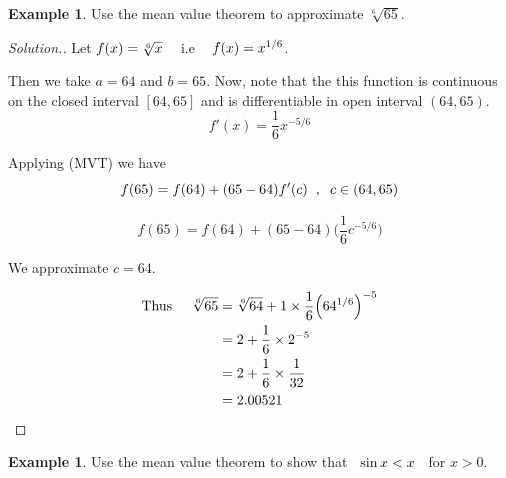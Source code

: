 \documentclass[11pt,a4paper]{article}
\theoremstyle{definition}
\newtheorem{exa}[thm]{Example}
\newenvironment{solution}
  {\renewcommand{\qedsymbol}{}\begin{proof}[\textit{Solution}.]}
  {\end{proof}}
\begin{document}
\begin{exa}


Use the mean value theorem to approximate $\sqrt[6]{65}$.
\end{exa}


\begin{solution}


Let $f(x) = \sqrt[6]{x}\hspace{0.3cm}$ i.e $\hspace{0.3cm} f(x) = x^{1/6}$.


Then we take $a = 64$ and $b = 65$. Now, note that the this function is continuous on the closed interval $[64,65]$ and is differentiable in open interval $(64,65)$. 
$$f'(x) = \frac{1}{6}x^{-5/6}$$

Applying (MVT) we have
$$f(65) = f(64) + (65 - 64)f'(c)\hspace{0.2cm}, \hspace{0.2cm} c \in (64,65)$$ 

$$f(65) = f(64) + (65 - 64)\Big(\frac{1}{6}c^{-5/6}\Big)$$

We approximate $c = 64$.

\begin{align*}
\text{Thus}\hspace{0.5cm} \sqrt[6]{65} & = \sqrt[6]{64} + 1 \times \frac{1}{6}\Big( 64^{1/6}\Big)^{-5}\\
& = 2 + \frac{1}{6} \times 2^{-5}\\
& = 2 + \frac{1}{6}\times \frac{1}{32}\\
& = 2.00521\\
\end{align*}
\end{solution}

\begin{exa}


Use the mean value theorem to show that $\hspace{0.2cm} \sin x < x\hspace{0.2cm}$ for $x>0$.
\end{exa}
\end{document}
